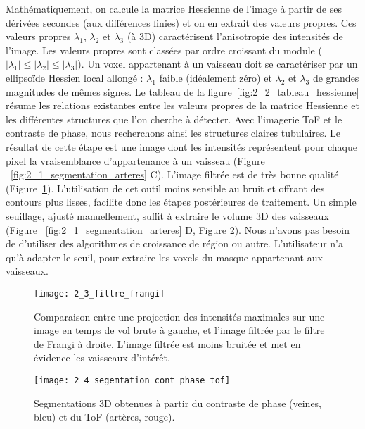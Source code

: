 Mathématiquement, on calcule la matrice Hessienne de l’image à partir de ses dérivées secondes (aux différences finies) et on en extrait des valeurs propres. Ces valeurs propres $\lambda_1$, $\lambda_2$ et $\lambda_3$ (à 3D) caractérisent l’anisotropie des intensités de l’image. Les valeurs propres sont classées par ordre croissant du module ($|\lambda_1|\leqslant|\lambda_2|\leqslant|\lambda_3|$). Un voxel appartenant à un vaisseau doit se caractériser par un ellipsoïde Hessien local allongé : $\lambda_1$ faible (idéalement zéro) et $\lambda_2$ et $\lambda_3$ de grandes magnitudes de mêmes signes. Le tableau de la figure~\ref{fig:2_2_tableau_hessienne} résume les relations existantes entre les valeurs propres de la matrice Hessienne et les différentes structures que l’on cherche à détecter. Avec l’imagerie ToF et le contraste de phase, nous recherchons ainsi les structures claires tubulaires. Le résultat de cette étape est une image dont les intensités représentent pour chaque pixel la vraisemblance d’appartenance à un vaisseau (Figure ~\ref{fig:2_1_segmentation_arteres} C). L’image filtrée est de très bonne qualité (Figure~\ref{fig:2_3_filtre_frangi}). L’utilisation de cet outil moins sensible au bruit et offrant des contours plus lisses, facilite donc les étapes postérieures de traitement. Un simple seuillage, ajusté manuellement, suffit à extraire le volume 3D des vaisseaux (Figure ~\ref{fig:2_1_segmentation_arteres} D, Figure \ref{fig:2_4_segemtation_cont_phase_tof}). Nous n’avons pas besoin de d’utiliser des algorithmes de croissance de région ou autre. L’utilisateur n’a qu’à adapter le seuil, pour extraire les voxels du masque appartenant aux vaisseaux. 
\begin{figure}[!t]
\centering
\texttt{[image: 2\_3\_filtre\_frangi]}
\caption{Comparaison entre une projection des intensités maximales sur une image en temps de vol brute à gauche, et l'image filtrée par le filtre de Frangi à droite. L'image filtrée est moins bruitée et met en évidence les vaisseaux d'intérêt.}
\label{fig:2_3_filtre_frangi}	
\end{figure}	

\begin{figure}[!b]
\centering
\texttt{[image: 2\_4\_segemtation\_cont\_phase\_tof]}
\caption{Segmentations 3D obtenues à partir du contraste de phase (veines, bleu) et du ToF (artères, rouge).}
\label{fig:2_4_segemtation_cont_phase_tof}	
\end{figure}	

